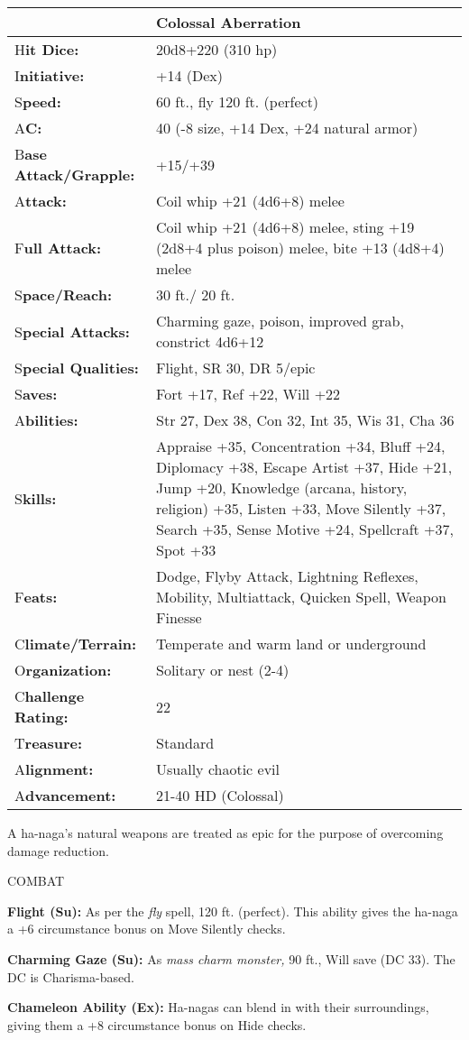 \documentclass{article}
\begin{document}
{\begin{tabular}{|>{\raggedright}p{63pt}|>{\raggedright}p{262pt}|}
\hline
  & Colossal Aberration \tabularnewline
\hline
H\textbf{it Dice:} & 20d8+220 (310 hp) \tabularnewline
\hline
I\textbf{nitiative:} & +14 (Dex) \tabularnewline
\hline
S\textbf{peed:} & 60 ft., fly 120 ft. (perfect) \tabularnewline
\hline
A\textbf{C:} & 40 (-8 size, +14 Dex, +24 natural armor) \tabularnewline
\hline
B\textbf{ase Attack/Grapple:} & +15/+39\tabularnewline
\hline
A\textbf{ttack:} & Coil whip +21 (4d6+8) melee\tabularnewline
\hline
F\textbf{ull Attack:} & Coil whip +21 (4d6+8) melee, sting +19 (2d8+4 plus poison) 
melee, bite +13 (4d8+4) melee\tabularnewline
\hline
S\textbf{pace/Reach:} & 30 ft./ 20 ft. \tabularnewline
\hline
S\textbf{pecial Attacks:} & Charming gaze, poison, improved grab, constrict 4d6+12 
\tabularnewline
\hline
S\textbf{pecial Qualities:} & Flight, SR 30, DR 5/epic \tabularnewline
\hline
S\textbf{aves:} & Fort +17, Ref +22, Will +22 \tabularnewline
\hline
A\textbf{bilities:} & Str 27, Dex 38, Con 32, Int 35, Wis 31, Cha 36 \tabularnewline
\hline
S\textbf{kills:} & Appraise +35, Concentration +34, Bluff +24, Diplomacy +38, Escape 
Artist +37, Hide +21, Jump +20, Knowledge (arcana, history, religion) +35, Listen 
+33, Move Silently +37, Search +35, Sense Motive +24, Spellcraft +37, Spot +33\tabularnewline
\hline
F\textbf{eats:} & Dodge, Flyby Attack, Lightning Reflexes, Mobility, Multiattack, 
Quicken Spell, Weapon Finesse \tabularnewline
\hline
C\textbf{limate/Terrain:} & Temperate and warm land or underground \tabularnewline
\hline
O\textbf{rganization:} & Solitary or nest (2-4) \tabularnewline
\hline
C\textbf{hallenge Rating:} & 22 \tabularnewline
\hline
T\textbf{reasure:} & Standard \tabularnewline
\hline
A\textbf{lignment:} & Usually chaotic evil \tabularnewline
\hline
A\textbf{dvancement:} & 21-40 HD (Colossal) \tabularnewline
\hline
\end{tabular}

A ha-naga's natural weapons are treated as epic for the purpose of overcoming damage 
reduction.

COMBAT 

\textbf{Flight (Su):} As per the \textit{fly }spell, 120 ft. (perfect). This ability 
gives the ha-naga a +6 circumstance bonus on Move Silently checks. 

\textbf{Charming Gaze (Su):} As \textit{mass charm monster, }90 ft., Will save 
(DC 33). The DC is Charisma-based.

\textbf{Chameleon Ability (Ex):} Ha-nagas can blend in with their surroundings, 
giving them a +8 circumstance bonus on Hide checks. 

}
\end{document}
